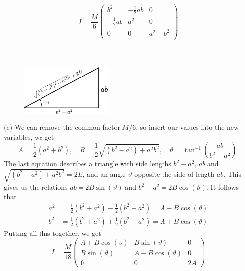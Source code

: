 \documentclass{article}
\begin{document}
        \begin{equation*}
            I = \frac{M}{6}
            \begin{pmatrix*}
                b^2 & -\frac{1}{2} ab & 0 \\
                -\frac{1}{2} ab & a^2 & 0 \\
                0 & 0 & a^2 + b^2 \\
            \end{pmatrix*}
        \end{equation*}
        \\ \\
        \begin{figure}
            \includegraphics[width=0.4\textwidth]{figures/exercise_1_triangle2.pdf}
        \end{figure}
        (c) We can remove the common factor $M/6$, so insert our values into the new variables, we get
        \begin{equation*}
            A = \frac{1}{2}(a^2 + b^2), \quad B = \frac{1}{2}\sqrt{(b^2 - a^2) +a^2b^2}, \quad \vartheta = \tan^{-1}\left( \frac{ab}{b^2 - a^2} \right).
        \end{equation*} 
        \newpage
        The last equation describes a triangle with side lengths $b^2 - a^2, \, ab$ and $\sqrt{(b^2 - a^2) +a^2b^2} = 2B$, and an angle $\vartheta$ opposite the side of length $ab$. This gives us the relations $ab=2 B \sin(\vartheta)$ and $b^2 - a^2 = 2B \cos(\vartheta)$. It follows that
        \begin{align*}
            a^2 &= \frac{1}{2}(b^2 + a^2)  - \frac{1}{2}(b^2 - a^2) = A - B \cos(\vartheta) \\
        b^2 &= \frac{1}{2}(b^2 + a^2)  + \frac{1}{2}(b^2 - a^2) = A + B \cos(\vartheta)
        \end{align*}
        Putting all this together, we get 
        \begin{equation*}
            I = \frac{M}{18}
            \begin{pmatrix*}
                A + B\cos(\vartheta) & B \sin(\vartheta) & 0 \\
                B \sin(\vartheta) & A - B\cos(\vartheta) & 0 \\
                0 & 0 & 2A
            \end{pmatrix*}
        \end{equation*}
\end{document}
